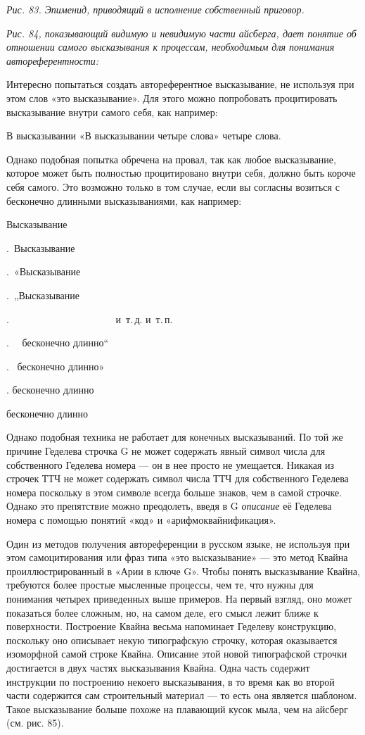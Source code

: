 \documentclass[../main.tex]{subfiles}
\begin{document}
\emph{Рис. 83. Эпименид, приводящий в исполнение собственный приговор.}

\emph{Рис. 84, показывающий видимую и невидимую части айсберга, дает понятие об отношении самого высказывания к процессам, необходимым для понимания автореферентности:}

Интересно попытаться создать автореферентное высказывание, не используя при этом слов «это высказывание». Для этого можно попробовать процитировать высказывание внутри самого себя, как например:

В высказывании «В высказывании четыре слова» четыре слова.

Однако подобная попытка обречена на провал, так как любое высказывание, которое может быть полностью процитировано внутри себя, должно быть короче себя самого. Это возможно только в том случае, если вы согласны возиться с бесконечно длинными высказываниями, как например:

Высказывание

.~Высказывание

.~«Высказывание

.~„Высказывание

.~~~~~~~~~~~~~~~~~~~~~ и~т.\,д. и~т.\,п.

.~~ бесконечно длинно``

.~ бесконечно длинно»

. бесконечно длинно

бесконечно длинно

Однако подобная техника не работает для конечных высказываний. По той же причине Геделева строчка G не может содержать явный символ числа для собственного Геделева номера --- он в нее просто не умещается. Никакая из строчек ТТЧ не может содержать символ числа ТТЧ для собственного Геделева номера поскольку в этом символе всегда больше знаков, чем в самой строчке. Однако это препятствие можно преодолеть, введя в G \emph{описание} её Геделева номера с помощью понятий «код» и «арифмоквайнификация».

Один из методов получения автореференции в русском языке, не используя при этом самоцитирования или фраз типа «это высказывание» --- это метод Квайна проиллюстрированный в «Арии в ключе G». Чтобы понять высказывание Квайна, требуются более простые мысленные процессы, чем те, что нужны для понимания четырех приведенных выше примеров. На первый взгляд, оно может показаться более сложным, но, на самом деле, его смысл лежит ближе к поверхности. Построение Квайна весьма напоминает Геделеву конструкцию, поскольку оно описывает некую типографскую строчку, которая оказывается изоморфной самой строке Квайна. Описание этой новой типографской строчки достигается в двух частях высказывания Квайна. Одна часть содержит инструкции по построению некоего высказывания, в то время как во второй части содержится сам строительный материал --- то есть она является шаблоном. Такое высказывание больше похоже на плавающий кусок мыла, чем на айсберг (см. рис. 85).
\end{document}
